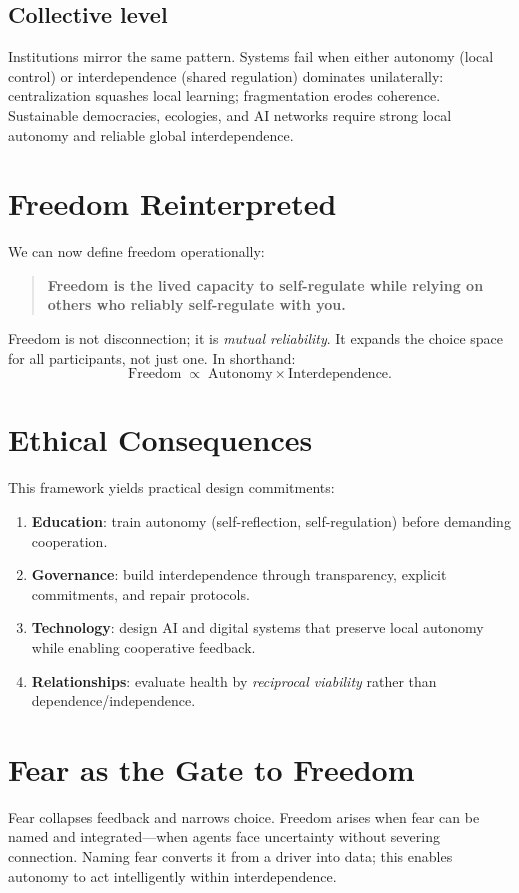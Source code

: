 \documentclass[11pt,a4paper]{article}
\begin{document}
\subsection{Collective level}
Institutions mirror the same pattern.
Systems fail when either autonomy (local control) or interdependence (shared regulation) dominates unilaterally: centralization squashes local learning; fragmentation erodes coherence.
Sustainable democracies, ecologies, and AI networks require strong local autonomy and reliable global interdependence.

\section{Freedom Reinterpreted}
We can now define freedom operationally:
\begin{quote}
\textbf{Freedom is the lived capacity to self-regulate while relying on others who reliably self-regulate with you.}
\end{quote}
Freedom is not disconnection; it is \emph{mutual reliability}.
It expands the choice space for all participants, not just one.
In shorthand:
\begin{equation}
  \text{Freedom} \;\propto\; \text{Autonomy} \times \text{Interdependence}.
\end{equation}

\section{Ethical Consequences}
This framework yields practical design commitments:
\begin{enumerate}
    \item \textbf{Education}: train autonomy (self-reflection, self-regulation) before demanding cooperation.
    \item \textbf{Governance}: build interdependence through transparency, explicit commitments, and repair protocols.
    \item \textbf{Technology}: design AI and digital systems that preserve local autonomy while enabling cooperative feedback.
    \item \textbf{Relationships}: evaluate health by \emph{reciprocal viability} rather than dependence/independence.
\end{enumerate}

\section{Fear as the Gate to Freedom}
Fear collapses feedback and narrows choice.
Freedom arises when fear can be named and integrated---when agents face uncertainty without severing connection.
Naming fear converts it from a driver into data; this enables autonomy to act intelligently within interdependence.
\end{document}
